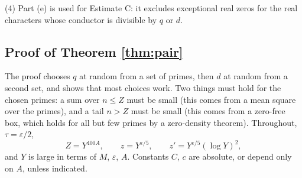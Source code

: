 \documentclass[11pt,letterpaper]{article}
\begin{document}
(4) Part (e) is used for Estimate C: it excludes exceptional real zeros for the real characters whose
conductor is divisible by $q$ or $d$.


\subsection*{Proof of Theorem \ref{thm:pair}}

The proof chooses $q$ at random from a set of primes, then $d$ at random from a second set, and shows that
most choices work. Two things must hold for the chosen primes: a sum over $n\le Z$ must be small (this comes
from a mean square over the primes), and a tail $n>Z$ must be small (this comes from a zero-free box, which
holds for all but few primes by a zero-density theorem). Throughout, $\tau=\varepsilon/2$,
\begin{equation}\label{D:114}
 Z=Y^{400A},\qquad z=Y^{\varepsilon/5},\qquad z'=Y^{\varepsilon/5}(\log Y)^2 ,
\end{equation}
and $Y$ is large in terms of $M$, $\varepsilon$, $A$. Constants $C$, $c$ are absolute, or depend only on $A$, unless indicated.
\end{document}
